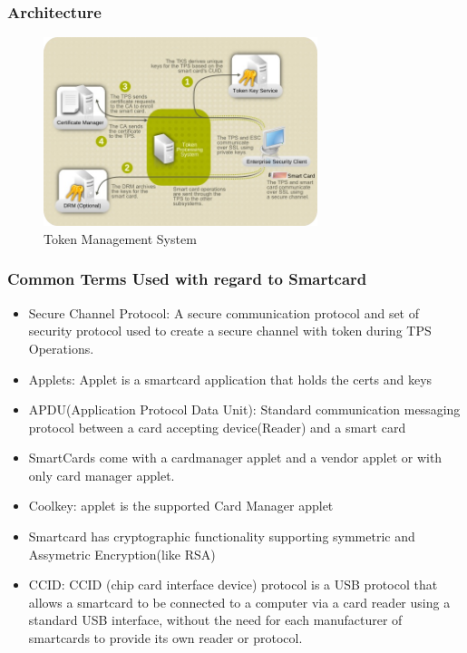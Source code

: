 \documentclass[a4paper]{article}
\begin{document}
\subsubsection{Architecture}
\begin{figure}[H]
    \centering
    \includegraphics[width=80mm]{TMS-workflow.png}
    \caption{Token Management System}
\end{figure}
\subsubsection{Common Terms Used with regard to Smartcard}
    \begin{itemize}
        \item Secure Channel Protocol: A secure communication protocol and set of security protocol used to 
            create a secure channel with token during TPS Operations.
        \item Applets: Applet is a smartcard application that holds the certs and keys
        \item APDU(Application Protocol Data Unit): Standard communication messaging protocol between a card accepting device(Reader)
            and a smart card 
        \item SmartCards come with a cardmanager applet and a vendor applet or with only card manager applet. 
        \item Coolkey: applet is the supported Card Manager applet
        \item Smartcard has cryptographic functionality supporting symmetric and Assymetric Encryption(like RSA)
        \item CCID: CCID (chip card interface device) protocol is a USB protocol that allows a smartcard to be 
            connected to a computer via a card reader using a standard USB interface, without the need for 
            each manufacturer of smartcards to provide its own reader or protocol.~\cite{wiki:ccid}
    \end{itemize}
\end{document}
